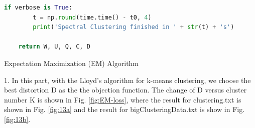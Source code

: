 \begin{description}
\begin{description}
\begin{lstlisting}[language=Python, caption=Spectral Clustering Algorithm Python Code]
    if verbose is True:
        t = np.round(time.time() - t0, 4)
        print('Spectral Clustering finished in ' + str(t) + 's')

    return W, U, Q, C, D
\end{lstlisting}

\end{description}

\newpage
\item[\Romannum{5}.] Expectation Maximization (EM) Algorithm

\begin{description}
\item{1.} In this part, with the Lloyd's algorithm for k-means clustering, we choose the best distortion D as the the objection function. The change of D versus cluster number K is shown in Fig. \ref{fig:EM-loss}, where the result for clustering.txt is shown in Fig. \ref{fig:13a} and the result for bigClusteringData.txt is show in Fig. \ref{fig:13b}.


\end{description}
\end{description}
